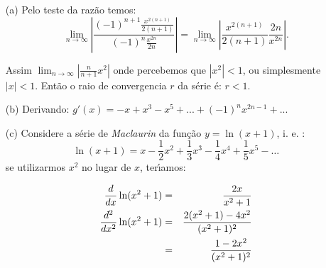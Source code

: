 \begin{enumerate}

\item[(a)] Pelo teste da raz\~ao temos: $$\lim_{n\to\infty}\left|\frac{(-1)^{n+1}\displaystyle \frac{x^{2(n+1)}}{2(n+1)}}{(-1)^n\displaystyle \frac{x^{2n}}{2n}}\right|=\lim_{n\to\infty}\left|\frac{x^{2(n+1)}}{2(n+1)}\frac{2n}{x^{2n}}\right|.$$

Assim $\lim_{n\to\infty} \left|\frac{n}{n+1}x^2\right|$ onde percebemos que $|x^2|<1$, ou simplesmente $|x|<1$. Ent\~ao o raio de convergencia $r$ da s\'erie \'e: $r<1$.

\item[(b)] Derivando: $g'(x)=\displaystyle -x+x^3-x^5+...+(-1)^n x^{2n-1}+...$

\item[(c)] Considere a s\'erie de {\it Maclaurin} da fun\c c\~ao $y=\ln(x+1)$, i. e. : $$\ln(x+1)=x - \frac1{2} x^2 + \frac1{3}x^3 - \frac1{4}x^4 + \frac1{5}x^5-\ldots$$ se utilizarmos $x^2$ no lugar de $x$, ter\'\i amos:

\begin{eqnarray*}
{d\over dx}\ln(x^2+1)&=&{2x\over x^2+1}\\
{d^2\over dx^2}\ln(x^2+1)&=&{2(x^2+1)-4x^2\over(x^2+1)^2}\\
&=&{1-2x^2\over(x^2+1)^2}
\end{eqnarray*}

\end{enumerate}


